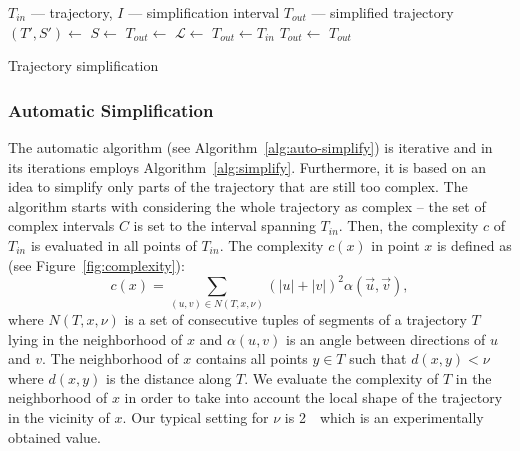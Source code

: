 \begin{algorithm}
  \begin{algorithmic}[1]
	  \Require $T_{in}$ --- trajectory, $I$ --- simplification interval
	  \Ensure $T_{out}$ --- simplified trajectory
			\State $(T', S') \gets$  
			\State $S \gets$ 
			\State
				\State $T_{out} \gets$ 
			\Else %
			  \State $\mathcal{L} \gets$  
				\State $T_{out} \gets T_{in}$
				 
					  \State $T_{out} \gets$ 
					\EndFor
				\EndFor
			\EndIf
			\State
			\State {}
			\State \Return $T_{out}$
		\EndProcedure
  \end{algorithmic}
	\caption{Trajectory simplification}
  \label{alg:simplify}
\end{algorithm}

\subsubsection*{Automatic Simplification}

The automatic algorithm (see Algorithm~\ref{alg:auto-simplify}) is iterative and in its iterations employs Algorithm~\ref{alg:simplify}.
Furthermore, it is based on an idea to simplify only parts of the trajectory that are still too complex.
The algorithm starts with considering the whole trajectory as complex -- the set of complex intervals $C$ is set to the interval spanning $T_{in}$.
Then, the complexity $c$ of $T_{in}$ is evaluated in all points of $T_{in}$.
The complexity $c(x)$ in point $x$ is defined as (see Figure~\ref{fig:complexity}):
\begin{equation}
  c(x) = \sum_{(u, v) \in N(T, x, \nu)}{(|u| + |v|)^2 \alpha(\vec{u}, \vec{v})}, %
\label{eq:complexity}
\end{equation}
where $N(T, x, \nu)$ is a set of consecutive tuples of segments of a trajectory $T$ lying in the neighborhood of $x$ and $\alpha(u, v)$ is an angle between directions of $u$ and $v$.
The neighborhood of $x$ contains all points $y \in T$ such that $d(x, y) < \nu$ where $d(x, y)$ is the distance along $T$.
We evaluate the complexity of $T$ in the neighborhood of $x$ in order to take into account the local shape of the trajectory in the vicinity of $x$.
Our typical setting for $\nu$ is 2~\angstrom\ which is an experimentally obtained value.

